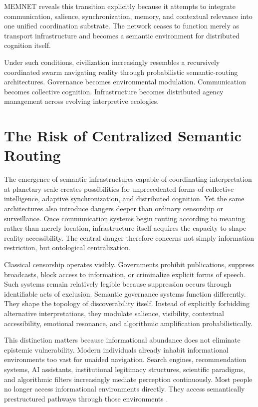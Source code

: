 \documentclass[11pt,a4paper]{article}
\begin{document}
MEMNET reveals this transition explicitly because it attempts to integrate communication, salience, synchronization, memory, and contextual relevance into one unified coordination substrate. The network ceases to function merely as transport infrastructure and becomes a semantic environment for distributed cognition itself.

Under such conditions, civilization increasingly resembles a recursively coordinated swarm navigating reality through probabilistic semantic-routing architectures. Governance becomes environmental modulation. Communication becomes collective cognition. Infrastructure becomes distributed agency management across evolving interpretive ecologies.

\section{The Risk of Centralized Semantic Routing}

The emergence of semantic infrastructures capable of coordinating interpretation at planetary scale creates possibilities for unprecedented forms of collective intelligence, adaptive synchronization, and distributed cognition. Yet the same architectures also introduce dangers deeper than ordinary censorship or surveillance. Once communication systems begin routing according to meaning rather than merely location, infrastructure itself acquires the capacity to shape reality accessibility. The central danger therefore concerns not simply information restriction, but ontological centralization.

Classical censorship operates visibly. Governments prohibit publications, suppress broadcasts, block access to information, or criminalize explicit forms of speech. Such systems remain relatively legible because suppression occurs through identifiable acts of exclusion. Semantic governance systems function differently. They shape the topology of discoverability itself. Instead of explicitly forbidding alternative interpretations, they modulate salience, visibility, contextual accessibility, emotional resonance, and algorithmic amplification probabilistically.

This distinction matters because informational abundance does not eliminate epistemic vulnerability. Modern individuals already inhabit informational environments too vast for unaided navigation. Search engines, recommendation systems, AI assistants, institutional legitimacy structures, scientific paradigms, and algorithmic filters increasingly mediate perception continuously. Most people no longer access informational environments directly. They access semantically prestructured pathways through those environments \cite{pasquale2015}.
\end{document}
